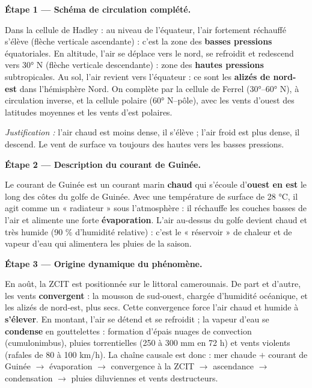 \documentclass[11pt]{article}
\newcounter{popsec}
\newcounter{popsub}
\newcommand{\courssub}[1]{%
  \stepcounter{popsub}%
  \par\vspace{9pt}\noindent{\popxbold\fontsize{11.5}{13}\selectfont\color{popink}{\color{poporange}\thepopsec.\thepopsub}\hspace{6pt}#1}\par\nopagebreak\vspace{4pt}
}
\begin{document}
\courssub{Démarche et corrigé commenté}

\begin{exoresolu}
\textbf{Étape 1 — Schéma de circulation complété.}

Dans la cellule de Hadley : au niveau de l'équateur, l'air fortement réchauffé s'élève (flèche verticale ascendante) : c'est la zone des \textbf{basses pressions} équatoriales. En altitude, l'air se déplace vers le nord, se refroidit et redescend vers 30° N (flèche verticale descendante) : zone des \textbf{hautes pressions} subtropicales. Au sol, l'air revient vers l'équateur : ce sont les \textbf{alizés de nord-est} dans l'hémisphère Nord. On complète par la cellule de Ferrel (30°--60° N), à circulation inverse, et la cellule polaire (60° N--pôle), avec les vents d'ouest des latitudes moyennes et les vents d'est polaires.

\emph{Justification :} l'air chaud est moins dense, il s'élève ; l'air froid est plus dense, il descend. Le vent de surface va toujours des hautes vers les basses pressions.

\textbf{Étape 2 — Description du courant de Guinée.}

Le courant de Guinée est un courant marin \textbf{chaud} qui s'écoule d'\textbf{ouest en est} le long des côtes du golfe de Guinée. Avec une température de surface de 28 °C, il agit comme un « radiateur » sous l'atmosphère : il réchauffe les couches basses de l'air et alimente une forte \textbf{évaporation}. L'air au-dessus du golfe devient chaud et très humide (90 \% d'humidité relative) : c'est le « réservoir » de chaleur et de vapeur d'eau qui alimentera les pluies de la saison.

\textbf{Étape 3 — Origine dynamique du phénomène.}

En août, la ZCIT est positionnée sur le littoral camerounais. De part et d'autre, les vents \textbf{convergent} : la mousson de sud-ouest, chargée d'humidité océanique, et les alizés de nord-est, plus secs. Cette convergence force l'air chaud et humide à \textbf{s'élever}. En montant, l'air se détend et se refroidit ; la vapeur d'eau se \textbf{condense} en gouttelettes : formation d'épais nuages de convection (cumulonimbus), pluies torrentielles (250 à 300 mm en 72 h) et vents violents (rafales de 80 à 100 km/h). La chaîne causale est donc : mer chaude $+$ courant de Guinée $\rightarrow$ évaporation $\rightarrow$ convergence à la ZCIT $\rightarrow$ ascendance $\rightarrow$ condensation $\rightarrow$ pluies diluviennes et vents destructeurs.


\end{exoresolu}
\end{document}
